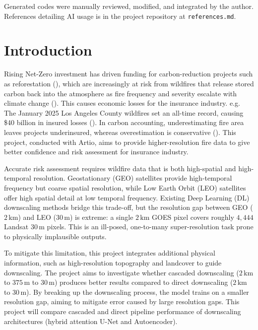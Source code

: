 \documentclass[a4paper, 11pt]{article} %
\begin{document}
Generated codes were manually reviewed, modified, and integrated by the author. References detailing AI usage is in the project repository at \texttt{references.md}.

\clearpage

\tableofcontents
\clearpage

\section{Introduction}
Rising Net-Zero investment has driven funding for carbon-reduction projects such as reforestation (\cite{InvestmentTrendsOutcomes}), which are increasingly at risk from wildfires that release stored carbon back into the atmosphere as fire frequency and severity escalate with climate change (\cite{jonesClimateChangeIncreases}). This causes economic losses for the insurance industry. e.g. The January 2025 Los Angeles County wildfires set an all-time record, causing \$40 billion in insured losses (\cite{staffHowWildfiresStorms2026}). In carbon accounting, underestimating fire area leaves projects underinsured, whereas overestimation is conservative (\cite{grassiApplyingConservativenessPrinciple2008}). This project, conducted with Artio, aims to provide higher-resolution fire data to give better confidence and risk assessment for insurance industry.

Accurate risk assessment requires wildfire data that is both high-spatial and high-temporal resolution. Geostationary (GEO) satellites provide high-temporal frequency but coarse spatial resolution, while Low Earth Orbit (LEO) satellites offer high spatial detail at low temporal frequency. Existing Deep Learning (DL) downscaling methods bridge this trade-off, but the resolution gap between GEO ($2\,\text{km}$) and LEO ($30\,\text{m}$) is extreme: a single $2\,\text{km}$ GOES pixel covers roughly $4,444$ Landsat $30\,\text{m}$ pixels. This is an ill-posed, one-to-many super-resolution task prone to physically implausible outputs.

To mitigate this limitation, this project integrates additional physical information, such as high-resolution topography and landcover to guide downscaling. The project aims to investigate whether cascaded downscaling ($2\,\text{km}$ to $375\,\text{m}$ to $30\,\text{m}$) produces better results compared to direct downscaling ($2\,\text{km}$ to $30\,\text{m}$). By breaking up the downscaling process, the model trains on a smaller resolution gap, aiming to mitigate error caused by large resolution gaps. This project will compare cascaded and direct pipeline performance of downscaling architectures (hybrid attention U-Net and Autoencoder).
\end{document}
